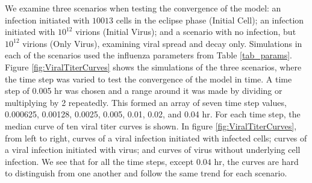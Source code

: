 We examine three scenarios when testing the convergence of the model: an infection initiated with $10013$ cells in the eclipse phase (Initial Cell); an infection initiated with $10^{12}$ virions (Initial Virus); and a scenario with no infection, but $10^{12}$ virions (Only Virus), examining viral spread and decay only. Simulations in each of the scenarios used the influenza parameters from Table \ref{tab_params}. Figure \ref{fig:ViralTiterCurves} shows the simulations of the three scenarios, where the time step was varied to test the convergence of the model in time. A time step of 0.005 hr was chosen and a range around it was made by dividing or multiplying by 2 repeatedly. This formed an array of seven time step values, 0.000625, 0.00128, 0.0025, 0.005, 0.01, 0.02, and 0.04 hr. For each time step, the median curve of ten viral titer curves is shown. In figure \ref{fig:ViralTiterCurves}, from left to right, curves of a viral infection initiated with infected cells; curves of a viral infection initiated with virus; and curves of virus without underlying cell infection. We see that for all the time steps, except $0.04$ hr, the curves are hard to distinguish from one another and follow the same trend for each scenario. 


